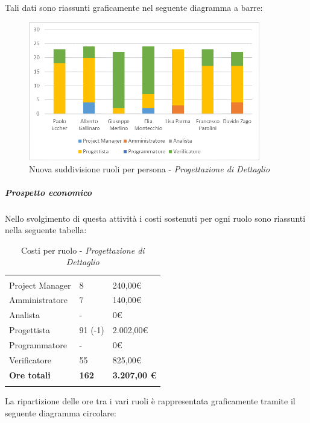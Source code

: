 Tali dati sono riassunti graficamente nel seguente diagramma a barre:
\begin{figure}[H] 
	\centering 
	\includegraphics[width=0.9\textwidth]{images/BarreProgettazioneDiDettaglioNuova.png} 
	\caption{Nuova suddivisione ruoli per persona - \textit{Progettazione di Dettaglio}}
	\label{BarreProgettazioneDiDettaglio}
\end{figure}

\subparagraph{Prospetto economico} \Spazio
Nello svolgimento di questa attività i costi sostenuti per ogni ruolo sono riassunti nella seguente tabella:
\begin{table}[H]
	\centering
	\begin{tabular}{|p{4cm}|C{4cm}|C{4cm}|}
		
		 & &\\
		Project Manager & 8 & 240,00\euro \\
		\hline
		Amministratore& 7 & 140,00\euro \\
		\hline
		Analista & - & 0\euro \\
		\hline
		Progettista & 91 (-1) & 2.002,00\euro \\
		\hline
		Programmatore & - & 0\euro \\
		\hline
		Verificatore & 55 & 825,00\euro \\
		\hline
		\textbf{Ore totali} & \textbf{162} & \textbf{3.207,00 \euro} \\
	\end{tabular}
	\caption{Costi per ruolo - \textit{Progettazione di Dettaglio}}
\end{table}

La ripartizione delle ore tra i vari ruoli è rappresentata graficamente tramite il seguente diagramma circolare:

